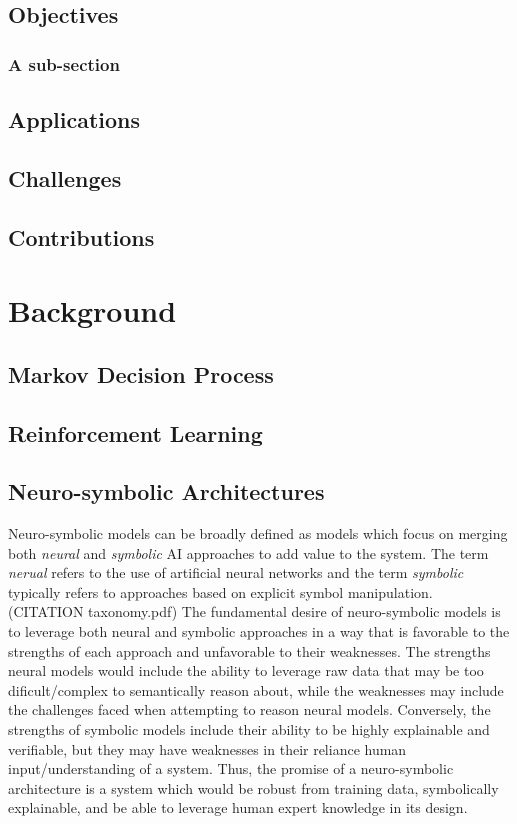 \documentclass[doublespace,draft,nopageskip]{VTthesis} %
\begin{document}
    \section{Objectives} \label{se:objectives}
			\lipsum[2]
			\subsection{A sub-section} \label{ss:this_subsection}
				\lipsum[1-4]
	\section{Applications} \label{se:applications}
	\section{Challenges} \label{se:challenges}
	\section{Contributions} \label{se:contributions}
			\lipsum[1-2]

    \chapter{Background} \label{ch:background}
    \section{Markov Decision Process} \label{se:markov_decision_process}
    \section{Reinforcement Learning} \label{se:reinforcement_learning}
    \section{Neuro-symbolic Architectures} \label{se:neurosymbolic_architectures}
		Neuro-symbolic models can be broadly defined as models which focus on merging both \textit{neural} and \textit{symbolic} AI approaches to add value to the system. The term \textit{nerual} refers to the use of artificial neural networks and the term \textit{symbolic} typically refers to approaches based on explicit symbol manipulation. (CITATION taxonomy.pdf) The fundamental desire of neuro-symbolic models is to leverage both neural and symbolic approaches in a way that is favorable to the strengths of each approach and unfavorable to their weaknesses. The strengths neural models would include the ability to leverage raw data that may be too dificult/complex to semantically reason about, while the weaknesses may include the challenges faced when attempting to reason neural models. Conversely, the strengths of symbolic models include their ability to be highly explainable and verifiable, but they may have weaknesses in their reliance human input/understanding of a system. Thus, the promise of a neuro-symbolic architecture is a system which would be robust from training data, symbolically explainable, and be able to leverage human expert knowledge in its design. 
\end{document}
